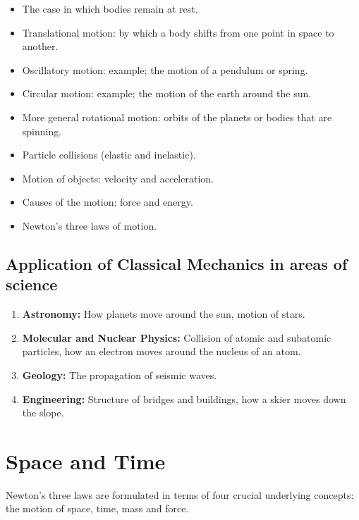 \documentclass[a4paper,12pt]{article}
\begin{document}
\begin{itemize}
    \item The case in which bodies remain at rest.
    \item Translational motion: by which a body shifts from one point in space to another.
    \item Oscillatory motion: example; the motion of a pendulum or spring.
    \item Circular motion: example; the motion of the earth around the sun.
    \item More general rotational motion: orbits of the planets or bodies that are spinning.
    \item Particle collisions (elastic and inelastic).
    
    \item Motion of objects: velocity and acceleration.
    \item Causes of the motion: force and energy.
    \item Newton’s three laws of motion.
\end{itemize}

\subsection{Application of Classical Mechanics in areas of science}

\begin{enumerate}
    \item \textbf{Astronomy:} How planets move around the sun, motion of stars.
    \item \textbf{Molecular and Nuclear Physics:} Collision of atomic and subatomic particles, how an electron moves around the nucleus of an atom.
    \item \textbf{Geology:} The propagation of seismic waves.
    \item \textbf{Engineering:} Structure of bridges and buildings, how a skier moves down the slope.
\end{enumerate}

\newpage
\section{Space and Time}
Newton’s three laws are formulated in terms of four crucial underlying concepts: the motion of
 space, time, mass and force.
\end{document}
